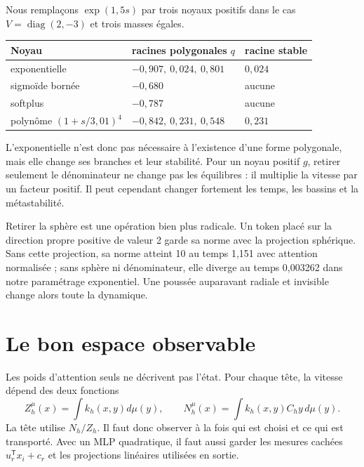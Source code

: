 \documentclass[11pt,a4paper]{article}
\theoremstyle{definition}
\newcommand{\T}{\mathsf T}
\begin{document}
Nous remplaçons $\exp(1{,}5s)$ par trois noyaux positifs dans le cas
$V=\operatorname{diag}(2,-3)$ et trois masses égales.

\begin{center}
\begin{tabularx}{0.88\textwidth}{YYl}
\toprule
Noyau & racines polygonales $q$ & racine stable \\
\midrule
exponentielle & $-0{,}907,\ 0{,}024,\ 0{,}801$ & $0{,}024$ \\
sigmoïde bornée & $-0{,}680$ & aucune \\
softplus & $-0{,}787$ & aucune \\
polynôme $(1+s/3{,}01)^4$ & $-0{,}842,\ 0{,}231,\ 0{,}548$ & $0{,}231$ \\
\bottomrule
\end{tabularx}
\end{center}

L'exponentielle n'est donc pas nécessaire à l'existence d'une forme polygonale, mais
elle change ses branches et leur stabilité. Pour un noyau positif $g$, retirer
seulement le dénominateur ne change pas les équilibres : il multiplie la vitesse par
un facteur positif. Il peut cependant changer fortement les temps, les bassins et la
métastabilité.

Retirer la sphère est une opération bien plus radicale. Un token placé sur la direction
propre positive de valeur 2 garde sa norme avec la projection sphérique. Sans cette
projection, sa norme atteint 10 au temps 1,151 avec attention normalisée ; sans sphère
ni dénominateur, elle diverge au temps 0,003262 dans notre paramétrage exponentiel. Une
poussée auparavant radiale et invisible change alors toute la dynamique.

\section{Le bon espace observable}
\label{sec:observable}

Les poids d'attention seuls ne décrivent pas l'état. Pour chaque tête, la vitesse
dépend des deux fonctions
\begin{equation}
 Z_h^{\mu}(x)=\int k_h(x,y)d\mu(y),\qquad
 N_h^{\mu}(x)=\int k_h(x,y)C_hy\,d\mu(y).\label{eq:observables}
\end{equation}
La tête utilise $N_h/Z_h$. Il faut donc observer à la fois qui est choisi et ce qui est
transporté. Avec un MLP quadratique, il faut aussi garder les mesures cachées
$u_r^{\T}x_i+c_r$ et les projections linéaires utilisées en sortie.
\end{document}
